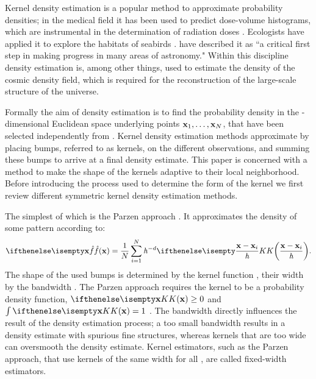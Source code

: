 Kernel density estimation is a popular method to approximate probability densities; in the medical field it has been used to predict dose-volume histograms, which are instrumental in the determination of radiation doses \cite{SkarpmanDose2015}. Ecologists have applied it to explore the habitats of seabirds \cite{lees2016using}. \textcite{ferdosi2011comparison} have described it as ``a critical first step in making progress in many areas of astronomy."  Within this discipline  density estimation is, among other things, used to estimate the density of the cosmic density field, which is required for the reconstruction of the large-scale structure of the universe.

Formally the aim of density estimation is to find the probability density \varDensityFunction{\varPattern} in the \varDim-dimensional Euclidean space underlying \varNumPatterns points $\varPattern[1], \dotsc, \varPattern[\varNumPatterns]$, that have been selected independently from \varDensityFunction{\varPattern}. Kernel density estimation methods approximate \varDensityFunction{\varPattern} by placing bumps, referred to as kernels, on the different observations, and summing these bumps to arrive at a final density estimate. This paper is concerned with a method to make the shape of the kernels adaptive to their local neighborhood. Before introducing the process used to determine the form of the kernel we first review different symmetric kernel density estimation methods.

	The simplest of which is the Parzen approach \cite{parzen1962estimation}. It approximates the density of some pattern \varPattern according to:
	\begin{equation}\label{eq:1:parzen}
		\varEstimatedDensityFunction{\varPattern} = \frac{1}{\varNumPatterns}\sum_{\itXis = 1}^{\varNumPatterns} \varBandwidth^{-\varDim}\varKernel{\frac{\varPattern - \varPattern[\itXis]}{\varBandwidth}}.
	\end{equation}
	The shape of the used bumps is determined by the kernel function \varKernel{\bullet}, their width by the bandwidth \varBandwidth. The Parzen approach requires the kernel to be a probability density function, \ie $\varKernel{\varPattern} \geq 0$ and $\int \varKernel{\varPattern} = 1$ \cite{silverman1986density}. 
	The bandwidth directly influences the result of the density estimation process; a too small bandwidth results in a density estimate with spurious fine structures, whereas kernels that are too wide can oversmooth the density estimate. Kernel estimators, such as the Parzen approach, that use kernels of the same width for all \varPattern[\itXis], are called fixed-width estimators.

